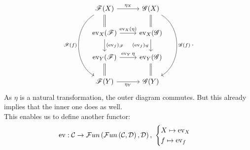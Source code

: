 \begin{rem}
\[\begin{tikzcd}
    \ffunc(X)\ar{r}{\eta_X}\ar[equal]{d} \ar[bend right=60,swap]{ddd}{\ffunc(f)}&\gfunc(X)\ar[equal]{d}\ar[bend left=60]{ddd}{\gfunc(f)}\\
    \ev_X(\ffunc)\ar{r}{\ev_X(\eta)}\ar{d}{(\ev_f)_{\ffunc}}& \ev_X(\gfunc)\ar[swap]{d}{(\ev_f)_{\gfunc}}\\
    \ev_Y(\ffunc)\ar{r}{\ev_Y{\eta}}& \ev_Y(\gfunc)\\
    \ffunc(Y)\ar[swap]{r}{\eta_Y}\ar[equal]{u}&\gfunc(Y)\ar[equal]{u}
  \end{tikzcd}.
  \]
  As $\eta$ is a natural transformation, the outer diagram commutes. But this already implies that the inner one does as well. \\
  This enables us to define another functor:
  \[
  \operatorname{ev}:\mathcal{C} \to \mathcal{F}un\left(\mathcal{F}un\left(\mathcal{C},\mathcal{D}\right),\mathcal{D}\right),~\begin{cases}X\mapsto \operatorname{ev}_X\\ f\mapsto \operatorname{ev}_f\end{cases}
  \]
\end{rem}

